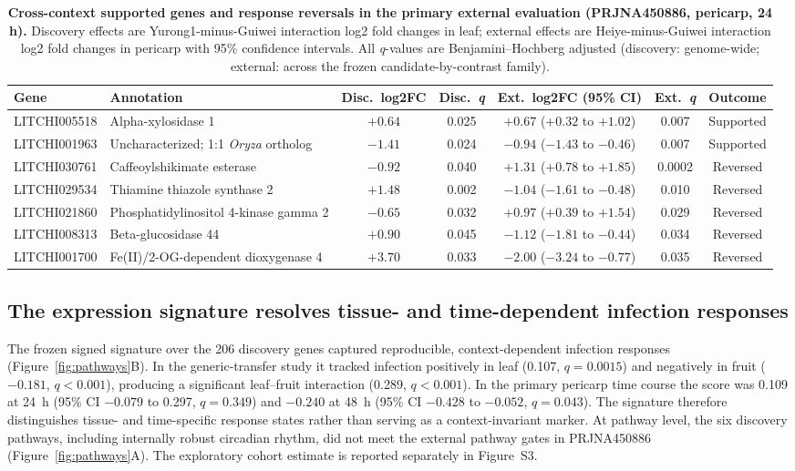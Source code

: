 \documentclass[referee,pdflatex,sn-basic,Numbered]{sn-jnl}
\newcommand{\q}{\textit{q}}
\begin{document}
\begin{table}[htbp]
\centering
\caption{\textbf{Cross-context supported genes and response reversals in the primary external evaluation (PRJNA450886, pericarp, 24 h).} Discovery effects are Yurong1-minus-Guiwei interaction log2 fold changes in leaf; external effects are Heiye-minus-Guiwei interaction log2 fold changes in pericarp with 95\% confidence intervals. All \q-values are Benjamini--Hochberg adjusted (discovery: genome-wide; external: across the frozen candidate-by-contrast family).}
\label{tab:external}
\footnotesize
\setlength{\tabcolsep}{2.4pt}
\begin{tabular}{@{}llccccc@{}}
\toprule
\textbf{Gene} & \textbf{Annotation} & \textbf{Disc.\ log2FC} & \textbf{Disc.\ \q} & \textbf{Ext.\ log2FC (95\% CI)} & \textbf{Ext.\ \q} & \textbf{Outcome} \\
\midrule
LITCHI005518 & Alpha-xylosidase 1 & $+0.64$ & 0.025 & $+0.67$ ($+0.32$ to $+1.02$) & 0.007 & Supported \\
LITCHI001963 & Uncharacterized; 1:1 \textit{Oryza} ortholog & $-1.41$ & 0.024 & $-0.94$ ($-1.43$ to $-0.46$) & 0.007 & Supported \\
LITCHI030761 & Caffeoylshikimate esterase & $-0.92$ & 0.040 & $+1.31$ ($+0.78$ to $+1.85$) & 0.0002 & Reversed \\
LITCHI029534 & Thiamine thiazole synthase 2 & $+1.48$ & 0.002 & $-1.04$ ($-1.61$ to $-0.48$) & 0.010 & Reversed \\
LITCHI021860 & Phosphatidylinositol 4-kinase gamma 2 & $-0.65$ & 0.032 & $+0.97$ ($+0.39$ to $+1.54$) & 0.029 & Reversed \\
LITCHI008313 & Beta-glucosidase 44 & $+0.90$ & 0.045 & $-1.12$ ($-1.81$ to $-0.44$) & 0.034 & Reversed \\
LITCHI001700 & Fe(II)/2-OG-dependent dioxygenase 4 & $+3.70$ & 0.033 & $-2.00$ ($-3.24$ to $-0.77$) & 0.035 & Reversed \\
\bottomrule
\end{tabular}
\end{table}

\subsection{The expression signature resolves tissue- and time-dependent infection responses}

The frozen signed signature over the 206 discovery genes captured reproducible, context-dependent infection responses (Figure~\ref{fig:pathways}B). In the generic-transfer study it tracked infection positively in leaf (0.107, $\q=0.0015$) and negatively in fruit ($-0.181$, $\q<0.001$), producing a significant leaf--fruit interaction (0.289, $\q<0.001$). In the primary pericarp time course the score was 0.109 at 24~h (95\% CI $-0.079$ to 0.297, $\q=0.349$) and $-0.240$ at 48~h (95\% CI $-0.428$ to $-0.052$, $\q=0.043$). The signature therefore distinguishes tissue- and time-specific response states rather than serving as a context-invariant marker. At pathway level, the six discovery pathways, including internally robust circadian rhythm, did not meet the external pathway gates in PRJNA450886 (Figure~\ref{fig:pathways}A). The exploratory cohort estimate is reported separately in Figure~S3.
\end{document}
